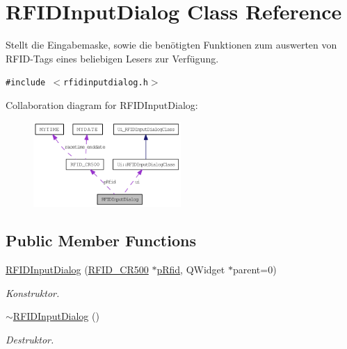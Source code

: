 \hypertarget{class_r_f_i_d_input_dialog}{
\section{RFIDInputDialog Class Reference}
\label{class_r_f_i_d_input_dialog}
}
Stellt die Eingabemaske, sowie die benötigten Funktionen zum auswerten von RFID-Tags eines beliebigen Lesers zur Verfügung.  


{\tt \#include $<$rfidinputdialog.h$>$}

Collaboration diagram for RFIDInputDialog:\nopagebreak
\begin{figure}[H]
\begin{center}
\leavevmode
\includegraphics[width=159pt]{class_r_f_i_d_input_dialog__coll__graph}
\end{center}
\end{figure}
\subsection*{Public Member Functions}
\begin{CompactItemize}
\item 
\hyperlink{class_r_f_i_d_input_dialog_cf018ae029903a460da1d2e8a6b4ab01}{RFIDInputDialog} (\hyperlink{class_r_f_i_d___c_r500}{RFID\_\-CR500} $\ast$\hyperlink{class_r_f_i_d_input_dialog_2fffb8807b878f9debba8d9b13046854}{pRfid}, QWidget $\ast$parent=0)
\begin{CompactList}\small\item\em Konstruktor. \item\end{CompactList}\item 
\hyperlink{class_r_f_i_d_input_dialog_59bcd5df12daee4281cdfbe451e11853}{$\sim$RFIDInputDialog} ()
\begin{CompactList}\small\item\em Destruktor. \item\end{CompactList}\end{CompactItemize}
